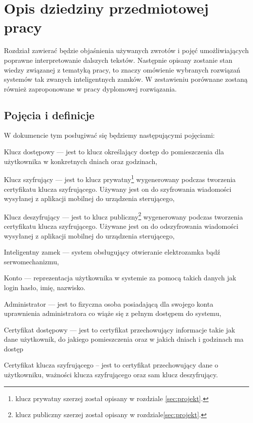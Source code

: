 % 
\newpage
\section{Opis dziedziny przedmiotowej pracy}\label{sec:dziedzina}
Rozdział zawierać będzie objaśnienia używanych zwrotów i pojęć umożliwiających poprawne interpretowanie dalszych tekstów. Następnie opisany zostanie stan wiedzy związanej z tematyką pracy, to znaczy omówienie wybranych rozwiązań systemów tak zwanych inteligentnych zamków. W zestawieniu porównane zostaną również zaproponowane w pracy dyplomowej rozwiązania.
\subsection{Pojęcia i definicje}
W dokumencie tym posługiwać się będziemy następującymi pojęciami:
\begin{itemize*}
	\item {Klucz dostępowy} --- jest to  klucz określający dostęp do pomieszczenia dla użytkownika w konkretnych dniach oraz godzinach,
	\item {Klucz szyfrujący} 
	--- jest to klucz prywatny\footnote{klucz prywatny szerzej został opisany w rozdziale \ref{sec:projekt}.} wygenerowany podczas tworzenia certyfikatu klucza szyfrującego. Używany jest on do szyfrowania wiadomości wysyłanej z aplikacji mobilnej do urządzenia sterującego,
	\item {Klucz deszyfrujący }
	--- jest to klucz publiczny\footnote{klucz publiczny szerzej został opisany w rozdziale\ref{sec:projekt}.} wygenerowany podczas tworzenia certyfikatu klucza szyfrującego. Używane jest on do odszyfrowania wiadomości wysyłanej z aplikacji mobilnej do urządzenia sterującego,
	\item {Inteligentny zamek}
	--- system obsługujący otwieranie elektrozamka bądź serwomechanizmu,
	\item {Konto}
	--- reprezentacja użytkownika w systemie za pomocą takich danych jak login hasło, imię, nazwisko.
	\item {Administrator}
	--- jest to fizyczna osoba posiadającą dla swojego konta uprawnienia administratora co wiąże się z pełnym dostępem do systemu,
	\item {Certyfikat dostępowy}
	--- jest to certyfikat przechowujący informacje takie jak dane użytkownik, do jakiego pomieszczenia oraz w jakich dniach i godzinach	ma dostęp
	\item {Certyfikat klucza szyfrującego}
	-- jest to certyfikat przechowujący dane o użytkowniku, ważności klucza szyfrującego oraz sam klucz deszyfrujący.
\end{itemize*}

